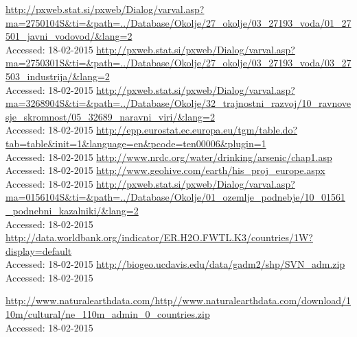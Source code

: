 \documentclass[11pt,a4paper]{article}
\begin{document}
\newpage
\begin{thebibliography}{9}
  \url{http://pxweb.stat.si/pxweb/Dialog/varval.asp?ma=2750104S&ti=&path=../Database/Okolje/27_okolje/03_27193_voda/01_27501_javni_vodovod/&lang=2}\\
  {Accessed: 18-02-2015}
  \url{http://pxweb.stat.si/pxweb/Dialog/varval.asp?ma=2750301S&ti=&path=../Database/Okolje/27_okolje/03_27193_voda/03_27503_industrija/&lang=2}\\
  {Accessed: 18-02-2015}
  \url{http://pxweb.stat.si/pxweb/Dialog/varval.asp?ma=3268904S&ti=&path=../Database/Okolje/32_trajnostni_razvoj/10_ravnovesje_skromnost/05_32689_naravni_viri/&lang=2}\\
  {Accessed: 18-02-2015}
  \url{http://epp.eurostat.ec.europa.eu/tgm/table.do?tab=table&init=1&language=en&pcode=ten00006&plugin=1}\\
  {Accessed: 18-02-2015}
  \url{http://www.nrdc.org/water/drinking/arsenic/chap1.asp}\\
  {Accessed: 18-02-2015}
  \url{http://www.geohive.com/earth/his_proj_europe.aspx}\\
  {Accessed: 18-02-2015}
  \url{http://pxweb.stat.si/pxweb/Dialog/varval.asp?ma=0156104S&ti=&path=../Database/Okolje/01_ozemlje_podnebje/10_01561_podnebni_kazalniki/&lang=2}\\
  {Accessed: 18-02-2015}
  \url{http://data.worldbank.org/indicator/ER.H2O.FWTL.K3/countries/1W?display=default}\\
  {Accessed: 18-02-2015}
  \url{http://biogeo.ucdavis.edu/data/gadm2/shp/SVN_adm.zip}\\
  {Accessed: 18-02-2015}

  \url{http://www.naturalearthdata.com/http//www.naturalearthdata.com/download/110m/cultural/ne_110m_admin_0_countries.zip}\\
  {Accessed: 18-02-2015}

\end{thebibliography}
\end{document}

